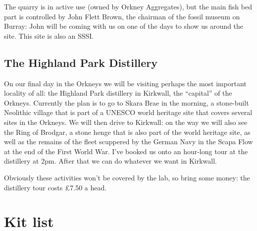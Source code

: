 \documentclass[12pt,letterpaper]{article}
\begin{document}
The quarry is in active use (owned by Orkney Aggregates), but the main fish bed part is controlled by John Flett Brown, the chairman of the fossil museum on Burray: John will be coming with us on one of the days to show us around the site.  This site is also an SSSI.

\subsection{The Highland Park Distillery}

On our final day in the Orkneys we will be visiting perhaps the most important locality of all: the Highland Park distillery in Kirkwall, the ``capital'' of the Orkneys.  Currently the plan is to go to Skara Brae in the morning, a stone-built Neolithic village that is part of a UNESCO world heritage site that covers several sites in the Orkneys.  We will then drive to Kirkwall: on the way we will also see the Ring of Brodgar, a stone henge that is also part of the world heritage site, as well as the remains of the fleet scuppered by the German Navy in the Scapa Flow at the end of the First World War. I've booked us onto an hour-long tour at the distillery at 2pm.  After that we can do whatever we want in Kirkwall.

Obviously these activities won't be covered by the lab, so bring some money: the distillery tour costs £7.50 a head.





\pagebreak
\section{Kit list}
\end{document}
